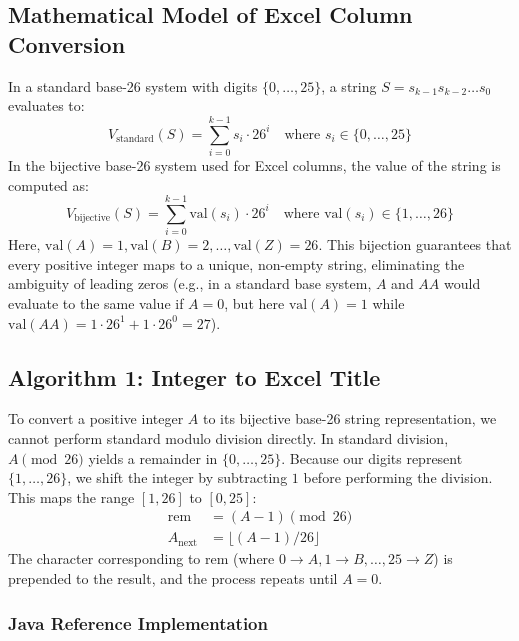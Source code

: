 \documentclass[10pt,journal,compsoc,onecolumn]{IEEEtran}
\begin{document}
\subsection{Mathematical Model of Excel Column Conversion}

In a standard base-26 system with digits $\{0, \ldots, 25\}$, a string $S = s_{k-1}s_{k-2}\ldots s_0$ evaluates to:
\begin{equation}
V_{\text{standard}}(S) = \sum_{i=0}^{k-1} s_i \cdot 26^i \quad \text{where } s_i \in \{0, \ldots, 25\}
\end{equation}
In the bijective base-26 system used for Excel columns, the value of the string is computed as:
\begin{equation}
V_{\text{bijective}}(S) = \sum_{i=0}^{k-1} \text{val}(s_i) \cdot 26^i \quad \text{where } \text{val}(s_i) \in \{1, \ldots, 26\}
\end{equation}
Here, $\text{val}(A) = 1, \text{val}(B) = 2, \ldots, \text{val}(Z) = 26$. This bijection guarantees that every positive integer maps to a unique, non-empty string, eliminating the ambiguity of leading zeros (e.g., in a standard base system, $A$ and $AA$ would evaluate to the same value if $A=0$, but here $\text{val}(A) = 1$ while $\text{val}(AA) = 1 \cdot 26^1 + 1 \cdot 26^0 = 27$).

\subsection{Algorithm 1: Integer to Excel Title}

To convert a positive integer $A$ to its bijective base-26 string representation, we cannot perform standard modulo division directly. In standard division, $A \pmod{26}$ yields a remainder in $\{0, \dots, 25\}$. Because our digits represent $\{1, \dots, 26\}$, we shift the integer by subtracting $1$ before performing the division. This maps the range $[1, 26]$ to $[0, 25]$:
\begin{align}
\text{rem} &= (A - 1) \pmod{26} \\
A_{\text{next}} &= \lfloor (A - 1) / 26 \rfloor
\end{align}
The character corresponding to $\text{rem}$ (where $0 \rightarrow A, 1 \rightarrow B, \dots, 25 \rightarrow Z$) is prepended to the result, and the process repeats until $A = 0$.

\subsubsection{Java Reference Implementation}
\end{document}
